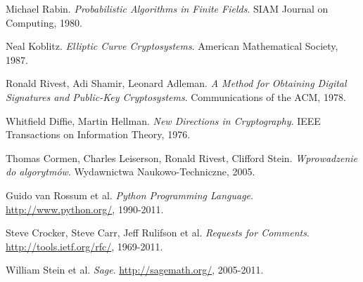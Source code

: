 \begin{thebibliography}{99}
    Michael Rabin.
    \emph{Probabilistic Algorithms in Finite Fields}.
    SIAM Journal on Computing, 1980.

    Neal Koblitz.
    \emph{Elliptic Curve Cryptosystems}.
    American Mathematical Society, 1987.

    Ronald Rivest, Adi Shamir, Leonard Adleman.
    \emph{A Method for Obtaining Digital Signatures
        and Public-Key Cryptosystems}.
    Communications of the ACM, 1978.

    Whitfield Diffie, Martin Hellman.
    \emph{New Directions in Cryptography}.
    IEEE Transactions on Information Theory, 1976.

    Thomas Cormen, Charles Leiserson, Ronald Rivest, Clifford Stein.
    \emph{Wprowadzenie do algorytmów}.
    Wydawnictwa Naukowo-Techniczne, 2005.

    Guido van Rossum et al.
    \emph{Python Programming Language}.
    \url{http://www.python.org/}, 1990-2011.

    Steve Crocker, Steve Carr, Jeff Rulifson et al.
    \emph{Requests for Comments}.
    \url{http://tools.ietf.org/rfc/}, 1969-2011.

    William Stein et al.
    \emph{Sage}.
    \url{http://sagemath.org/}, 2005-2011.

\end{thebibliography}
